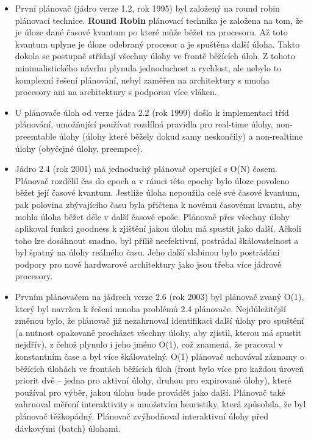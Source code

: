 \documentclass[
  master=true,
  font=sans,
  printversion=false,
  joinlists=true,
  figures=true,
  tables=true,
  sourcecodes=false,
  theorems=false,
  bibencoding=utf8,
  language=czech,
  encoding=utf8,
  field=ainfk,
  biblatex,
  glossaries,
  index
]{kidiplom}
\begin{document}
\begin{itemize}

\item První plánovač (jádro verze 1.2, rok 1995) byl založený na round robin plánovací technice. \textbf{Round Robin} plánovací technika je založena na tom, že je úloze dané časové kvantum po které může běžet na procesoru. Až toto kvantum uplyne je úloze odebraný procesor a je spuštěna další úloha. Takto dokola se postupně střídají všechny úlohy ve frontě běžících úloh. Z tohoto minimalistického návrhu plynula jednoduchost a rychlost, ale nebylo to komplexní řešení plánování, nebyl zaměřen na architektury s mnoha procesory ani na architektury s podporou více vláken.

\item U plánovače úloh od verze jádra 2.2 (rok 1999) došlo k implementaci tříd plánování, umožňující používat rozdílná pravidla pro real-time úlohy, non-preemtable úlohy (úlohy které běžely dokud samy neskončily) a non-realtime úlohy (obyčejné úlohy, preempce).

\item Jádro 2.4 (rok 2001) má jednoduchý plánovač operující s O(N) časem. Plánovač rozdělil čas do epoch a v rámci této epochy bylo úloze povoleno běžet její časové kvantum. Jestliže úloha nepoužila celé své časové kvantum, pak polovina zbývajícího času byla přičtena k novému časovému kvantu, aby mohla úloha běžet déle v další časové epoše. Plánovač přes všechny úlohy aplikoval funkci goodness k zjištění jakou úlohu má spustit jako další. Ačkoli toho lze dosáhnout snadno, byl příliš neefektivní, postrádal škálovatelnost a byl špatný na úlohy reálného času. Jeho další slabinou bylo postrádání podpory pro nové hardwarové architektury jako jsou třeba více jádrové procesory. 

\item Prvním plánovačem na jádrech verze 2.6 (rok 2003) byl plánovač zvaný O(1), který byl navržen k řešení mnoha problémů 2.4 plánovače. \linebreak Nejdůležitější změnou bylo, že plánovač již nezahrnoval identifikaci další úlohy pro spuštění (a nutnost opakovaně procházet všechny úlohy, aby zjistil, kterou má spustit nejdřív), z čehož plynulo i jeho jméno O(1), což znamená, že pracoval v konstantním čase a byl více škálovatelný. O(1) plánovač uchovával záznamy o běžících úlohách ve frontách běžících úloh (front bylo více pro každou úroveň priorit dvě – jedna pro aktivní úlohy, druhou pro expirované úlohy), které používal pro výběr, jakou úlohu bude provádět jako další. Plánovač také zahrnoval měření interaktivity s množstvím heuristiky, která způsobila, že byl plánovač těžkopádný. Plánovač zvýhodňoval interaktivní úlohy před dávkovými (batch) úlohami.

\end{itemize}
\end{document}
